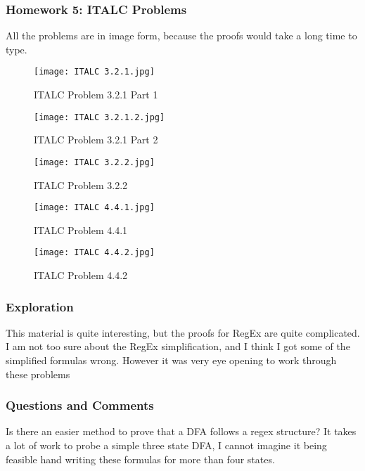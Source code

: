\documentclass{article}
\theoremstyle{theorem}
\theoremstyle{definition}
\theoremstyle{remark}
\begin{document}
\subsubsection{Homework 5: ITALC Problems}
All the problems are in image form, because the proofs would take a long time to type.

\begin{figure}[h]
    \centerline{\texttt{[image: ITALC 3.2.1.jpg]}}
    \caption{ITALC Problem 3.2.1 Part 1}
\end{figure}

\begin{figure}
    \centerline{\texttt{[image: ITALC 3.2.1.2.jpg]}}
    \caption{ITALC Problem 3.2.1 Part 2}
\end{figure}

\begin{figure}
    \centerline{\texttt{[image: ITALC 3.2.2.jpg]}}
    \caption{ITALC Problem 3.2.2}
\end{figure}

\begin{figure}
    \centerline{\texttt{[image: ITALC 4.4.1.jpg]}}
    \caption{ITALC Problem 4.4.1}
\end{figure}

\begin{figure}
    \centerline{\texttt{[image: ITALC 4.4.2.jpg]}}
    \caption{ITALC Problem 4.4.2}
\end{figure}



\subsubsection{Exploration}
This material is quite interesting, but the proofs for RegEx are quite complicated. I am not too sure about the RegEx simplification, and I think I got some of the simplified formulas wrong. However it was very eye opening to work through these problems

\subsubsection{Questions and Comments}
Is there an easier method to prove that a DFA follows a regex structure? It takes a lot of work to probe a simple three state DFA, I cannot imagine it being feasible hand writing these formulas for more than four states. 
\end{document}
